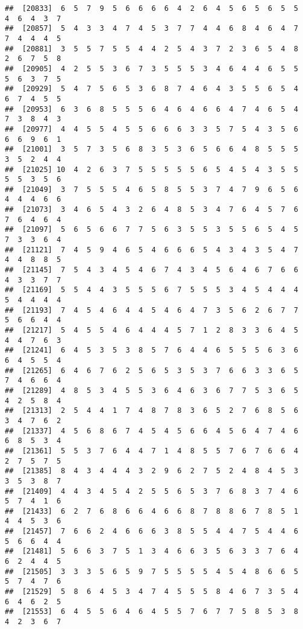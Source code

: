 \documentclass[
]{book}
\begin{document}
\begin{verbatim}
##  [20833]  6  5  7  9  5  6  6  6  6  4  2  6  4  5  6  5  6  5  5  4  6  4  3  7
##  [20857]  5  4  3  3  4  7  4  5  3  7  7  4  4  6  8  4  6  4  7  7  4  4  4  5
##  [20881]  3  5  5  7  5  5  4  4  2  5  4  3  7  2  3  6  5  4  8  2  6  7  5  8
##  [20905]  4  2  5  5  3  6  7  3  5  5  5  3  4  6  4  4  6  5  5  5  6  3  7  5
##  [20929]  5  4  7  5  6  5  3  6  8  7  4  6  4  3  5  5  6  5  4  6  7  4  5  5
##  [20953]  6  3  6  8  5  5  5  6  4  6  4  6  6  4  7  4  6  5  4  7  3  8  4  3
##  [20977]  4  4  5  5  4  5  5  6  6  6  3  3  5  7  5  4  3  5  6  6  6  9  6  1
##  [21001]  3  5  7  3  5  6  8  3  5  3  6  5  6  6  4  8  5  5  5  3  5  2  4  4
##  [21025] 10  4  2  6  3  7  5  5  5  5  5  6  5  4  5  4  3  5  5  5  5  3  5  6
##  [21049]  3  7  5  5  5  4  6  5  8  5  5  3  7  4  7  9  6  5  6  4  4  4  6  6
##  [21073]  3  4  6  5  4  3  2  6  4  8  5  3  4  7  6  4  5  7  6  7  6  4  6  4
##  [21097]  5  6  5  6  6  7  7  5  6  3  5  5  3  5  5  6  5  4  5  7  3  3  6  4
##  [21121]  7  4  5  9  4  6  5  4  6  6  6  5  4  3  4  3  5  4  7  4  4  8  8  5
##  [21145]  7  5  4  3  4  5  4  6  7  4  3  4  5  6  4  6  7  6  6  4  3  3  7  7
##  [21169]  5  5  4  4  3  5  5  5  6  7  5  5  5  3  4  5  4  4  4  5  4  4  4  4
##  [21193]  7  4  5  4  6  4  4  5  4  6  4  7  3  5  6  2  6  7  7  5  6  6  4  4
##  [21217]  5  4  5  5  4  6  4  4  4  5  7  1  2  8  3  3  6  4  5  4  4  7  6  3
##  [21241]  6  4  5  3  5  3  8  5  7  6  4  4  6  5  5  5  6  3  6  6  4  5  5  4
##  [21265]  6  4  6  7  6  2  5  6  5  3  5  3  7  6  6  3  3  6  5  7  4  6  6  4
##  [21289]  4  8  5  3  4  5  5  3  6  4  6  3  6  7  7  5  3  6  5  4  2  5  8  4
##  [21313]  2  5  4  4  1  7  4  8  7  8  3  6  5  2  7  6  8  5  6  3  4  7  6  2
##  [21337]  4  5  6  8  6  7  4  5  4  5  6  6  4  5  6  4  7  4  6  6  8  5  3  4
##  [21361]  5  5  3  7  6  4  4  7  1  4  8  5  5  7  6  7  6  6  4  2  7  5  7  5
##  [21385]  8  4  3  4  4  4  3  2  9  6  2  7  5  2  4  8  4  5  3  3  5  3  8  7
##  [21409]  4  4  3  4  5  4  2  5  5  6  5  3  7  6  8  3  7  4  6  5  7  4  1  6
##  [21433]  6  2  7  6  8  6  6  4  6  6  8  7  8  8  6  7  8  5  1  4  4  5  3  6
##  [21457]  7  6  6  2  4  6  6  6  3  8  5  5  4  4  7  5  4  4  6  5  6  6  4  4
##  [21481]  5  6  6  3  7  5  1  3  4  6  6  3  5  6  3  3  7  6  4  6  2  4  4  5
##  [21505]  3  3  3  5  6  5  9  7  5  5  5  5  4  5  4  8  6  6  5  5  7  4  7  6
##  [21529]  5  8  6  4  5  3  4  7  4  5  5  5  8  4  6  7  3  5  4  6  4  6  2  5
##  [21553]  6  4  5  5  6  4  6  4  5  5  7  6  7  7  5  8  5  3  8  4  2  3  6  7

\end{verbatim}
\end{document}
